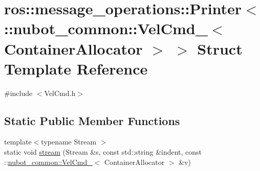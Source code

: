 \hypertarget{structros_1_1message__operations_1_1Printer_3_01_1_1nubot__common_1_1VelCmd___3_01ContainerAllocator_01_4_01_4}{\section{ros\-:\-:message\-\_\-operations\-:\-:Printer$<$ \-:\-:nubot\-\_\-common\-:\-:Vel\-Cmd\-\_\-$<$ Container\-Allocator $>$ $>$ Struct Template Reference}
\label{structros_1_1message__operations_1_1Printer_3_01_1_1nubot__common_1_1VelCmd___3_01ContainerAllocator_01_4_01_4}
}


{\ttfamily \#include $<$Vel\-Cmd.\-h$>$}

\subsection*{Static Public Member Functions}
\begin{DoxyCompactItemize}
\item 
{\footnotesize template$<$typename Stream $>$ }\\static void \hyperlink{structros_1_1message__operations_1_1Printer_3_01_1_1nubot__common_1_1VelCmd___3_01ContainerAllocator_01_4_01_4_aa47839537c83780310ca04bf8cfb3015}{stream} (Stream \&s, const std\-::string \&indent, const \-::\hyperlink{structnubot__common_1_1VelCmd__}{nubot\-\_\-common\-::\-Vel\-Cmd\-\_\-}$<$ Container\-Allocator $>$ \&v)
\end{DoxyCompactItemize}


